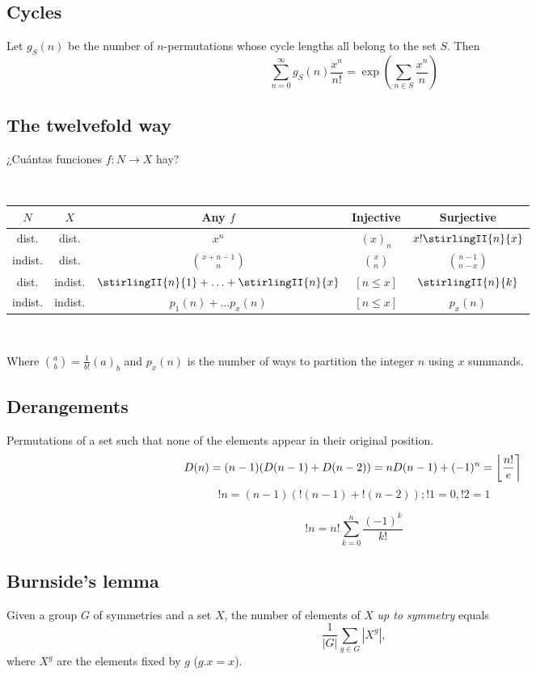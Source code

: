 	\subsection{Cycles}
		Let $g_S(n)$ be the number of $n$-permutations whose cycle lengths all belong to the set $S$. Then
		$$\sum_{n=0} ^\infty g_S(n) \frac{x^n}{n!} = \exp\left(\sum_{n\in S} \frac{x^n} {n} \right)$$

	\subsection{The twelvefold way} ¿Cuántas funciones $f \colon N \rightarrow X$ hay?

	\ 

	\begin{tabular}{|c|c|c|c|c|}
	\hline
	$N$ & $X$ & Any $f$ & Injective & Surjective \\ \hline
	dist. & dist. & $x^n$ & $(x)_n$ & $x! \stirlingII{n}{x}$ \\ \hline
	indist. & dist. & $\binom{x+n-1}{n}$ & $\binom{x}{n}$ & $\binom{n-1}{n-x}$ \\ \hline
	dist. & indist. & $\stirlingII{n}{1} + \ldots + \stirlingII{n}{x}$ & $[n \leq x]$ & $\stirlingII{n}{k}$ \\ \hline
	indist. & indist. & $p_1(n) + \ldots p_x(n)$ & $[n \leq x]$ & $p_x(n)$ \\ \hline
	\end{tabular}

	\ 

	Where $\binom{a}{b} = \frac{1}{b!}(a)_b $ and $p_x(n)$ is the number of ways to partition the integer $n$ using $x$ summands.

	\subsection{Derangements}
		Permutations of a set such that none of the elements appear in their original position.
		\[ \mkern-2mu D(n) = (n-1)(D(n-1)+D(n-2)) = n D(n-1)+(-1)^n = \left\lfloor\frac{n!}{e}\right\rceil \]
		\begin{equation*}
			!n = (n - 1)( !(n - 1) + !(n - 2) ); !1 = 0, !2 = 1
		  \end{equation*}
		  
		  \begin{equation*}
			!n = n! \sum_{k = 0}^n \frac{(-1)^k}{k!}
		  \end{equation*}
		  
	\subsection{Burnside's lemma}
		Given a group $G$ of symmetries and a set $X$, the number of elements of $X$ \emph{up to symmetry} equals
		 \[ {\frac {1}{|G|}}\sum _{{g\in G}}|X^{g}|, \]
		 where $X^{g}$ are the elements fixed by $g$ ($g.x = x$).

